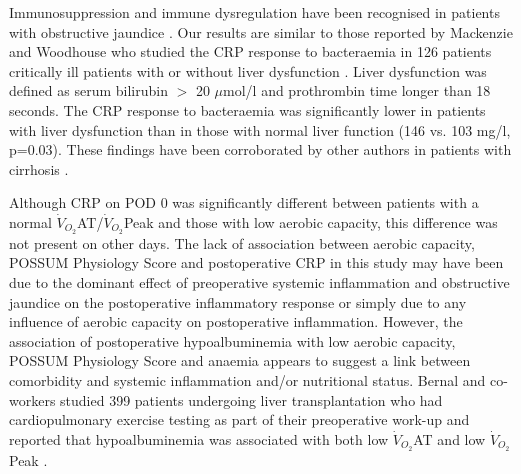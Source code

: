 Immunosuppression and immune dysregulation have been recognised in patients with obstructive jaundice \parencite{scott-conner_pathophysiology_1994}.
Our results are similar to those reported by Mackenzie and Woodhouse who studied the CRP response to bacteraemia in 126 patients critically ill patients with or without liver dysfunction \parencite{mackenzie_c-reactive_2006}. 
Liver dysfunction was defined as serum bilirubin $>$ 20 $\mu$mol/l and prothrombin time longer than 18 seconds. 
The CRP response to bacteraemia was significantly lower in patients with liver dysfunction than in those with normal liver function (146 vs. 103 mg/l, p=0.03). 
These findings have been corroborated by other authors in patients with cirrhosis \parencite{pieri_c-reactive_2014, janum_c-reactive_2011}.



Although CRP on POD 0 was significantly different between patients with a normal $\dot{V}_{O_2}$AT/$\dot{V}_{O_2}$Peak and those with low aerobic capacity, this difference was not present on other days. 
The lack of association between aerobic capacity, POSSUM Physiology Score and postoperative CRP in this study may have been due to the dominant effect of preoperative systemic inflammation and obstructive jaundice on the postoperative inflammatory response or simply due to any influence of aerobic capacity on postoperative inflammation.
However, the association of postoperative hypoalbuminemia with low aerobic capacity, POSSUM Physiology Score and anaemia appears to suggest a link between comorbidity and systemic inflammation and/or nutritional status.
Bernal and co-workers studied 399 patients undergoing liver transplantation who had cardiopulmonary exercise testing as part of their preoperative work-up and reported that hypoalbuminemia was associated with both low $\dot{V}_{O_2}$AT and low $\dot{V}_{O_2}$Peak \parencite{bernal_aerobic_2014}.


